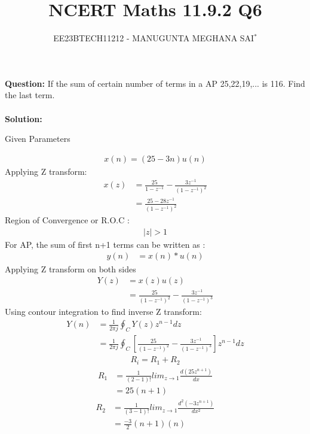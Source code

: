 \documentclass[journal,12pt,twocolumn]{IEEEtran}
\title{
	
	\title{NCERT Maths 11.9.2 Q6}
	\author{EE23BTECH11212 - MANUGUNTA MEGHANA SAI$^{*}$%
	}
	
	
}
\theoremstyle{remark}
\providecommand{\abs}[1]{\left\vert#1\right\vert}
\newcommand{\solution}{\noindent \textbf{Solution: }}
\begin{document}
	
	\maketitle
	
	\textbf{Question:} 
	If the sum of certain number of terms in a AP 25,22,19,... is 116. Find the last term.\\
	\\

	\solution
	 \begin{table}[h!]
	 	\centering
	 	\resizebox{6cm}{!}{
	 		
	 	}
	 	\caption{Given Parameters}
	 	\label{tab:my_label}
	 \end{table}

	\begin{align}
		x(n) = (25 - 3n)u(n)
		\label{eq:1}
	\end{align}
     Applying Z transform:
     \begin{align}
     	x(z) &=\frac{25}{1-z^{-1}} - \frac{3z^{-1}}{(1-z^{-1})^2}\\
     	&= \frac{25-28z^{-1}}{(1-z^{-1})^2} 
     \end{align}
     Region of Convergence or R.O.C :
     \begin{align}
     	\abs{z}>1
     \end{align}
For AP, the sum of first n+1 terms can be written as :
\begin{align}
	 y(n)&=x(n)*u(n)
\end{align}  
Applying Z transform on both sides
\begin{align}
	Y(z) &= x(z)u(z)\\
	&=\frac{25}{(1-z^{-1})^2} - \frac{3z^{-1}}{(1-z^{-1})^3}
\end{align}
Using contour integration to find inverse Z transform:
\begin{align}
	Y(n) &= \frac{1}{2\pi j} \oint_C Y(z) z^{n-1} dz\\
	&= \frac{1}{2\pi j} \oint_C [\frac{25}{(1-z^{-1})^2} - \frac{3z^{-1}}{(1-z^{-1})^3} ]z^{n-1} dz
\end{align}
\begin{align}
	R_i=R_1 + R_2
\end{align}
\begin{align}
	R_1 &= \frac{1}{{(2-1)!}} lim_{{z \to 1}} \frac{d (25z^{n+1})}{dx} \\
	&=25(n+1)
\end{align}
\begin{align}
	R_2 &= \frac{1}{{(3-1)!}} lim_{{z \to 1}}\frac{d^2(-3z^{n+1})}{dx^2}\\
	&= \frac{-3}{2}(n+1)(n)
\end{align}
\end{document}
